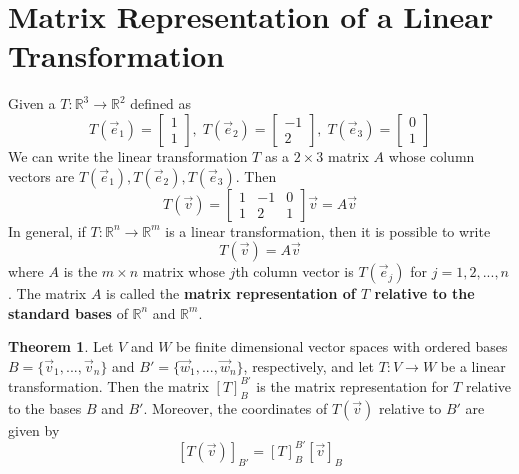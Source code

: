 \documentclass{article}
\theoremstyle{definition}
\newtheorem{theorem}{Theorem}
\newcommand{\reals}{\mathbb{R}}
\newcommand{\bmat}[1]{\begin{bmatrix}#1\end{bmatrix}}
\begin{document}
\section{Matrix Representation of a Linear Transformation}

Given a $T : \reals^3 \rightarrow \reals^2$ defined as
\[ T(\vec{e}_1) = \bmat{1\\1}, \; T(\vec{e}_2) = \bmat{-1\\2}, \; T(\vec{e}_3) = \bmat{0\\1} \]
We can write the linear transformation $T$ as a $2 \times 3$ matrix $A$ whose column vectors are $T(\vec{e}_1), T(\vec{e}_2), T(\vec{e}_3)$. Then
\[ T(\vec{v}) = \bmat{1&-1&0\\1&2&1} \vec{v} = A\vec{v} \]
In general, if $T: \reals^n \rightarrow \reals^m$ is a linear transformation, then it is possible to write \[T(\vec{v}) = A\vec{v}\]
where $A$ is the $m \times n$ matrix whose $j$th column vector is $T(\vec{e}_j)$ for $j = 1,2,...,n$.
The matrix $A$ is called the \textbf{matrix representation of $T$ relative to the standard bases} of $\reals^n$ and $\reals^m$.

\begin{theorem}
	Let $V$ and $W$ be finite dimensional vector spaces with ordered bases $B = \{\vec{v}_1,...,\vec{v}_n\}$ and $B' = \{ \vec{w}_1,...,\vec{w}_n \}$, respectively, and let $T: V \rightarrow W$ be a linear transformation. Then the matrix $[T]_B^{B'}$ is the matrix representation for $T$ relative to the bases $B$ and $B'$. Moreover, the coordinates of $T(\vec{v})$ relative to $B'$ are given by
	\[ [T(\vec{v})]_{B'} = [T]_B^{B'}[\vec{v}]_B \]
\end{theorem} 
\end{document}

